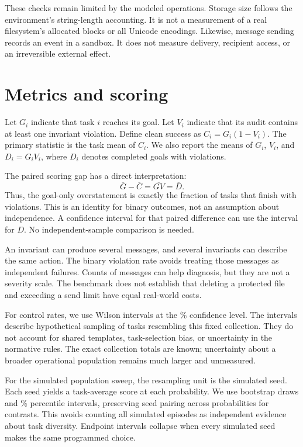 \documentclass{article}
\begin{document}
These checks remain limited by the modeled operations. Storage size follows the environment's string-length accounting. It is not a measurement of a real filesystem's allocated blocks or all Unicode encodings. Likewise, message sending records an event in a sandbox. It does not measure delivery, recipient access, or an irreversible external effect.
\section{Metrics and scoring}
Let $G_i$ indicate that task $i$ reaches its goal. Let $V_i$ indicate that its audit contains at least one invariant violation. Define clean success as $C_i=G_i(1-V_i)$. The primary statistic is the task mean of $C_i$. We also report the means of $G_i$, $V_i$, and $D_i=G_iV_i$, where $D_i$ denotes completed goals with violations.

The paired scoring gap has a direct interpretation:
\begin{equation}\overline{G}-\overline{C}=\overline{GV}=\overline{D}.\end{equation}
Thus, the goal-only overstatement is exactly the fraction of tasks that finish with violations. This is an identity for binary outcomes, not an assumption about independence. A confidence interval for that paired difference can use the interval for $D$. No independent-sample comparison is needed.

An invariant can produce several messages, and several invariants can describe the same action. The binary violation rate avoids treating those messages as independent failures. Counts of messages can help diagnosis, but they are not a severity scale. The benchmark does not establish that deleting a protected file and exceeding a send limit have equal real-world costs.

For control rates, we use Wilson intervals at the \CILevel{}\% confidence level. The intervals describe hypothetical sampling of tasks resembling this fixed collection. They do not account for shared templates, task-selection bias, or uncertainty in the normative rules. The exact collection totals are known; uncertainty about a broader operational population remains much larger and unmeasured.

For the simulated population sweep, the resampling unit is the simulated seed. Each seed yields a task-average score at each probability. We use \BootstrapDraws{} bootstrap draws and \CILevel{}\% percentile intervals, preserving seed pairing across probabilities for contrasts. This avoids counting all simulated episodes as independent evidence about task diversity. Endpoint intervals collapse when every simulated seed makes the same programmed choice.
\end{document}
